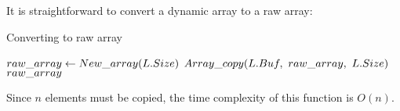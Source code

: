 \HdrDynArrayImpl

It is straightforward to convert a dynamic array to a raw array:

\begin{algorithm}[H]
	\caption{Converting to raw array \TextDynamicArray}
	\begin{algorithmic}
		\Function{$\FuncToArray$}{$\VarList$}
			\State $raw\_array \gets New\_array(L.Size)$
			\State $\FuncArrayCopy(\VarList.\FieldBuffer,\ \LclRawArray,\ \VarList.\FieldSize)$
			\State \Return $raw\_array$
		\EndFunction
	\end{algorithmic}
\end{algorithm}

Since $n$ elements must be copied, the time complexity of this function is $O(n)$.